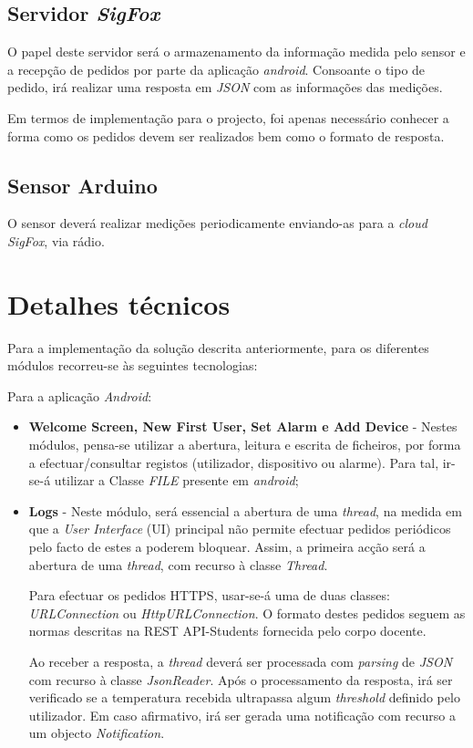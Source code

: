 \documentclass[a4paper]{article}
\begin{document}
\subsection*{Servidor \textit{SigFox}}

O papel deste servidor será o armazenamento da informação medida pelo sensor e a recepção de pedidos por parte da aplicação \textit{android}. Consoante o tipo de pedido, irá realizar uma resposta em \textit{JSON} com as informações das medições.

Em termos de implementação para o projecto, foi apenas necessário conhecer a forma como os pedidos devem ser realizados bem como o formato de resposta.

\subsection*{Sensor Arduino}

O sensor deverá realizar medições periodicamente enviando-as para a \textit{cloud SigFox}, via rádio.

\section*{Detalhes técnicos}

Para a implementação da solução descrita anteriormente, para os diferentes módulos recorreu-se às seguintes tecnologias:

Para a aplicação \textit{Android}:
\begin{itemize}
\item \textbf{Welcome Screen, New First User, Set Alarm e Add Device} - Nestes módulos, pensa-se utilizar a abertura, leitura e escrita de ficheiros, por forma a efectuar/consultar registos (utilizador, dispositivo ou alarme). Para tal, ir-se-á utilizar a Classe \textit{FILE} presente em \textit{android};

\item \textbf{Logs} - Neste módulo, será essencial a abertura de uma \textit{thread}, na medida em que a \textit{User Interface} (UI) principal não permite efectuar pedidos periódicos pelo facto de estes a poderem bloquear. Assim, a primeira acção será a abertura de uma \textit{thread}, com recurso à classe \textit{Thread}. 

Para efectuar os pedidos HTTPS, usar-se-á uma de duas classes: \textit{URLConnection} ou \textit{HttpURLConnection}. O formato destes pedidos seguem as normas descritas na REST API-Students fornecida pelo corpo docente.

Ao receber a resposta, a \textit{thread} deverá ser processada com \textit{parsing} de \textit{JSON} com recurso à classe \textit{JsonReader}. Após o processamento da resposta, irá ser verificado se a temperatura recebida ultrapassa algum \textit{threshold} definido pelo utilizador. Em caso afirmativo, irá ser gerada uma notificação com recurso a um objecto \textit{Notification}.
\end{itemize}
\end{document}
